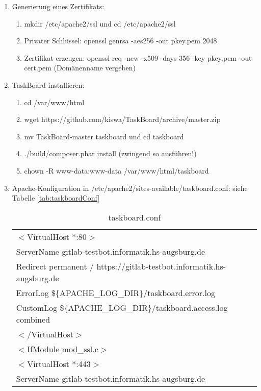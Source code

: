 \begin{enumerate}
	\item Generierung eines Zertifikats:
	\begin{enumerate}
		\item mkdir /etc/apache2/ssl und cd /etc/apache2/ssl
		\item Privater Schlüssel: openssl genrsa -aes256 -out pkey.pem 2048
		\item Zertifikat erzeugen: openssl req -new -x509 -days 356 -key pkey.pem -out cert.pem (Domänenname vergeben)
	\end{enumerate}
	\item TaskBoard installieren:
	\begin{enumerate}
		\item cd /var/www/html
		\item wget https://github.com/kiswa/TaskBoard/archive/master.zip
		\item mv TaskBoard-master taskboard und cd taskboard
		\item ./build/composer.phar install (zwingend so ausführen!)
		\item chown -R www-data:www-data /var/www/html/taskboard
	\end{enumerate}
	\item Apache-Konfiguration in /etc/apache2/sites-available/taskboard.conf: siehe Tabelle \ref{tab:taskboardConf}
	\begin{table}
		\centering
		\caption{taskboard.conf}
			\begin{tabular}{|l|}
				\hline
        $<$VirtualHost *:80$>$\\
        { }{ }{ }ServerName gitlab-testbot.informatik.hs-augsburg.de\\
        { }{ }{ }Redirect permanent / https://gitlab-testbot.informatik.hs-augsburg.de\\
        { }{ }{ }ErrorLog \$\{APACHE\_LOG\_DIR\}/taskboard.error.log\\
        { }{ }{ }CustomLog \$\{APACHE\_LOG\_DIR\}/taskboard.access.log combined\\
        $<$/VirtualHost$>$\\
        $<$IfModule mod\_ssl.c$>$\\
        { }{ }{ }$<$VirtualHost *:443$>$\\
        { }{ }{ }{ }{ }{ }ServerName gitlab-testbot.informatik.hs-augsburg.de\\

\end{tabular}
\end{table}
\end{enumerate}
